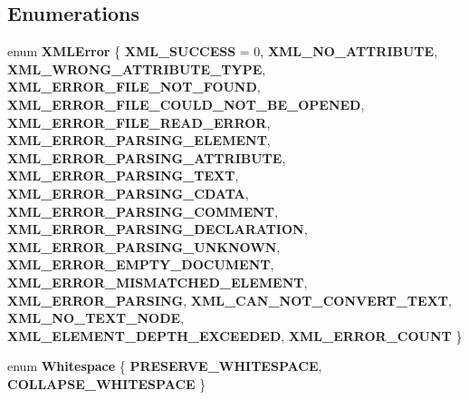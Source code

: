 \subsection*{Enumerations}
\begin{DoxyCompactItemize}
\item 
enum \textbf{ X\+M\+L\+Error} \{ \newline
\textbf{ X\+M\+L\+\_\+\+S\+U\+C\+C\+E\+SS} = 0, 
\textbf{ X\+M\+L\+\_\+\+N\+O\+\_\+\+A\+T\+T\+R\+I\+B\+U\+TE}, 
\textbf{ X\+M\+L\+\_\+\+W\+R\+O\+N\+G\+\_\+\+A\+T\+T\+R\+I\+B\+U\+T\+E\+\_\+\+T\+Y\+PE}, 
\textbf{ X\+M\+L\+\_\+\+E\+R\+R\+O\+R\+\_\+\+F\+I\+L\+E\+\_\+\+N\+O\+T\+\_\+\+F\+O\+U\+ND}, 
\newline
\textbf{ X\+M\+L\+\_\+\+E\+R\+R\+O\+R\+\_\+\+F\+I\+L\+E\+\_\+\+C\+O\+U\+L\+D\+\_\+\+N\+O\+T\+\_\+\+B\+E\+\_\+\+O\+P\+E\+N\+ED}, 
\textbf{ X\+M\+L\+\_\+\+E\+R\+R\+O\+R\+\_\+\+F\+I\+L\+E\+\_\+\+R\+E\+A\+D\+\_\+\+E\+R\+R\+OR}, 
\textbf{ X\+M\+L\+\_\+\+E\+R\+R\+O\+R\+\_\+\+P\+A\+R\+S\+I\+N\+G\+\_\+\+E\+L\+E\+M\+E\+NT}, 
\textbf{ X\+M\+L\+\_\+\+E\+R\+R\+O\+R\+\_\+\+P\+A\+R\+S\+I\+N\+G\+\_\+\+A\+T\+T\+R\+I\+B\+U\+TE}, 
\newline
\textbf{ X\+M\+L\+\_\+\+E\+R\+R\+O\+R\+\_\+\+P\+A\+R\+S\+I\+N\+G\+\_\+\+T\+E\+XT}, 
\textbf{ X\+M\+L\+\_\+\+E\+R\+R\+O\+R\+\_\+\+P\+A\+R\+S\+I\+N\+G\+\_\+\+C\+D\+A\+TA}, 
\textbf{ X\+M\+L\+\_\+\+E\+R\+R\+O\+R\+\_\+\+P\+A\+R\+S\+I\+N\+G\+\_\+\+C\+O\+M\+M\+E\+NT}, 
\textbf{ X\+M\+L\+\_\+\+E\+R\+R\+O\+R\+\_\+\+P\+A\+R\+S\+I\+N\+G\+\_\+\+D\+E\+C\+L\+A\+R\+A\+T\+I\+ON}, 
\newline
\textbf{ X\+M\+L\+\_\+\+E\+R\+R\+O\+R\+\_\+\+P\+A\+R\+S\+I\+N\+G\+\_\+\+U\+N\+K\+N\+O\+WN}, 
\textbf{ X\+M\+L\+\_\+\+E\+R\+R\+O\+R\+\_\+\+E\+M\+P\+T\+Y\+\_\+\+D\+O\+C\+U\+M\+E\+NT}, 
\textbf{ X\+M\+L\+\_\+\+E\+R\+R\+O\+R\+\_\+\+M\+I\+S\+M\+A\+T\+C\+H\+E\+D\+\_\+\+E\+L\+E\+M\+E\+NT}, 
\textbf{ X\+M\+L\+\_\+\+E\+R\+R\+O\+R\+\_\+\+P\+A\+R\+S\+I\+NG}, 
\newline
\textbf{ X\+M\+L\+\_\+\+C\+A\+N\+\_\+\+N\+O\+T\+\_\+\+C\+O\+N\+V\+E\+R\+T\+\_\+\+T\+E\+XT}, 
\textbf{ X\+M\+L\+\_\+\+N\+O\+\_\+\+T\+E\+X\+T\+\_\+\+N\+O\+DE}, 
\textbf{ X\+M\+L\+\_\+\+E\+L\+E\+M\+E\+N\+T\+\_\+\+D\+E\+P\+T\+H\+\_\+\+E\+X\+C\+E\+E\+D\+ED}, 
\textbf{ X\+M\+L\+\_\+\+E\+R\+R\+O\+R\+\_\+\+C\+O\+U\+NT}
 \}
\item 
enum \textbf{ Whitespace} \{ \textbf{ P\+R\+E\+S\+E\+R\+V\+E\+\_\+\+W\+H\+I\+T\+E\+S\+P\+A\+CE}, 
\textbf{ C\+O\+L\+L\+A\+P\+S\+E\+\_\+\+W\+H\+I\+T\+E\+S\+P\+A\+CE}
 \}
\end{DoxyCompactItemize}


